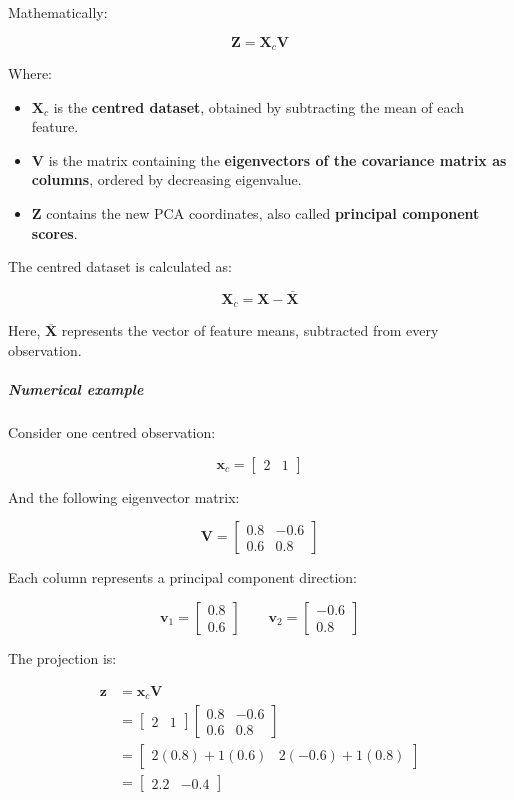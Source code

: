 \documentclass[11pt]{article}
\providecommand{\tightlist}{%
      \setlength{\itemsep}{0pt}\setlength{\parskip}{0pt}}
\begin{document}
Mathematically:

\[
\boxed{\mathbf Z=\mathbf X_c\mathbf V}
\]

Where:

\begin{itemize}
\tightlist
\item
  \(\mathbf X_c\) is the \textbf{centred dataset}, obtained by
  subtracting the mean of each feature.
\item
  \(\mathbf V\) is the matrix containing the \textbf{eigenvectors of the
  covariance matrix as columns}, ordered by decreasing eigenvalue.
\item
  \(\mathbf Z\) contains the new PCA coordinates, also called
  \textbf{principal component scores}.
\end{itemize}

The centred dataset is calculated as:

\[
\mathbf X_c=\mathbf X-\bar{\mathbf X}
\]

Here, \(\bar{\mathbf X}\) represents the vector of feature means,
subtracted from every observation.

\subparagraph{Numerical example}\label{numerical-example}

Consider one centred observation:

\[
\mathbf x_c=
\begin{bmatrix}
2 & 1
\end{bmatrix}
\]

And the following eigenvector matrix:

\[
\mathbf V=
\begin{bmatrix}
0.8 & -0.6\\
0.6 & 0.8
\end{bmatrix}
\]

Each column represents a principal component direction:

\[
\mathbf v_1=
\begin{bmatrix}
0.8\\
0.6
\end{bmatrix}
\qquad
\mathbf v_2=
\begin{bmatrix}
-0.6\\
0.8
\end{bmatrix}
\]

The projection is:

\[
\begin{aligned}
\mathbf z
&=\mathbf x_c\mathbf V\\[6pt]
&=
\begin{bmatrix}
2 & 1
\end{bmatrix}
\begin{bmatrix}
0.8 & -0.6\\
0.6 & 0.8
\end{bmatrix}\\[6pt]
&=
\begin{bmatrix}
2(0.8)+1(0.6) &
2(-0.6)+1(0.8)
\end{bmatrix}\\[6pt]
&=
\boxed{
\begin{bmatrix}
2.2 & -0.4
\end{bmatrix}
}
\end{aligned}
\]
\end{document}
